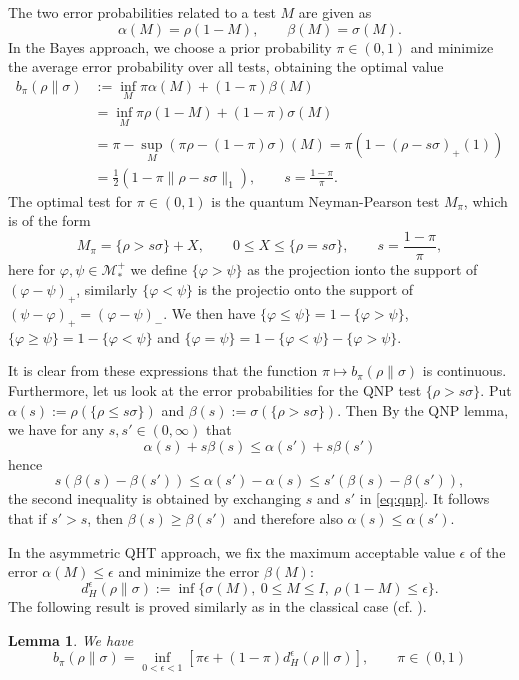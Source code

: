 \documentclass[12pt]{article}
\newtheorem{lemma}{Lemma}
\theoremstyle{definition}
\theoremstyle{remark}
\def\Me{\mathcal M}
\begin{document}
The two error probabilities related to a test $M$ are given as
\[
\alpha(M)=\rho(1-M),\qquad \beta(M)=\sigma(M).
\]
In the Bayes approach, we choose a prior probability $\pi\in (0,1)$ and minimize the
average error probability over all tests, obtaining the optimal value
\begin{align*}
b_\pi(\rho\|\sigma)&:=\inf_{M} \pi\alpha(M)+(1-\pi)\beta(M)\\
&=\inf_M\pi\rho(1-M)+(1-\pi)\sigma(M)\\
&= \pi -\sup_M (\pi\rho-(1-\pi)\sigma)(M)=\pi(1-(\rho-s\sigma)_+(1))\\
&= \frac12(1-\pi\|\rho-s\sigma\|_1),\qquad
s=\frac{1-\pi}{\pi}.
\end{align*}
The optimal test for $\pi\in (0,1)$ is the quantum Neyman-Pearson test $M_\pi$, which is of the form
\[
M_\pi=\{\rho>s\sigma\}+ X,\qquad 0\le X\le \{\rho=s\sigma\},\qquad s=\frac{1-\pi}{\pi},
\]
here for $\varphi,\psi\in \Me^+_*$ we define $\{\varphi>\psi\}$ as the projection ionto
the support of $(\varphi-\psi)_+$, similarly $\{\varphi<\psi\}$ is the projectio onto the
support of $(\psi-\varphi)_+=(\varphi-\psi)_-$. We then have
$\{\varphi\le\psi\}=1-\{\varphi>\psi\}$, $\{\varphi\ge \psi\}=1-\{\varphi<\psi\}$ and 
$\{\varphi=\psi\}=1-\{\varphi<\psi\}-\{\varphi>\psi\}$.


It is clear from
these expressions that the function $\pi\mapsto b_\pi(\rho\|\sigma)$ is continuous.  
Furthermore, let us look at the error probabilities for the QNP test $\{\rho>s\sigma\}$. 
Put $\alpha(s):=\rho(\{\rho\le s\sigma\})$ and $\beta(s):=\sigma(\{\rho>s\sigma\})$. Then 
By the QNP lemma, we have for any $s,s'\in (0,\infty)$ that 
\begin{equation}\label{eq:qnp}
\alpha(s)+s\beta(s)\le \alpha(s')+s\beta(s')
\end{equation}
hence 
\[
s(\beta(s)-\beta(s'))\le \alpha(s')-\alpha(s)\le s'(\beta(s)-\beta(s')),
\]
the second inequality is obtained by exchanging $s$ and $s'$ in \eqref{eq:qnp}. It follows
that if $s'>s$, then $\beta(s)\ge \beta(s')$ and therefore also $\alpha(s)\le \alpha(s')$. 



In the asymmetric QHT approach, we fix the maximum acceptable value $\epsilon$ of the error
$\alpha(M)\le \epsilon$ and minimize the error $\beta(M)$:
\[
d_H^\epsilon(\rho\|\sigma):=\inf\{\sigma(M),\ 0\le M\le I,\ \rho(1-M)\le
\epsilon\}.
\]
The following result is proved similarly as in the classical case (cf. \cite{liese...}).

\begin{lemma}\label{lemma:btodh} We have
\[
b_\pi(\rho\|\sigma)=\inf_{0<\epsilon<1}[
\pi\epsilon+(1-\pi)d_H^\epsilon(\rho\|\sigma)],\qquad \pi\in (0,1)
\]


\end{lemma}
\end{document}
